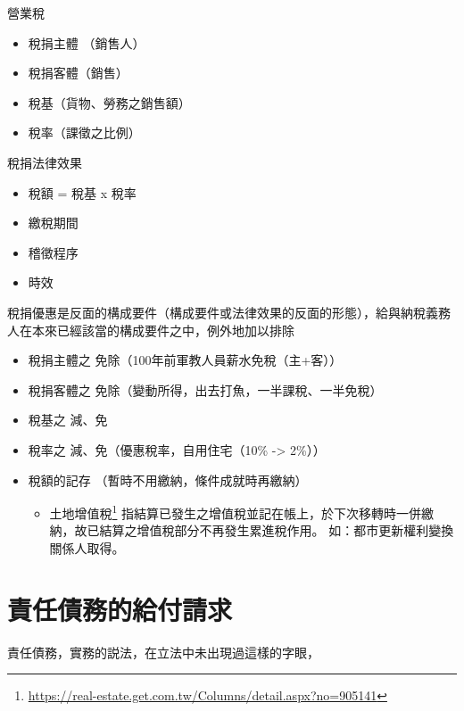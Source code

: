 \documentclass[]{ctexbook}
\providecommand{\tightlist}{%
  \setlength{\itemsep}{0pt}\setlength{\parskip}{0pt}}
\renewcommand{\href}[2]{#2\footnote{\url{#1}}}
\begin{document}
營業稅

\begin{itemize}
\tightlist
\item
  稅捐主體 （銷售人）
\item
  稅捐客體（銷售）
\item
  稅基（貨物、勞務之銷售額）
\item
  稅率（課徵之比例）
\end{itemize}

稅捐法律效果

\begin{itemize}
\tightlist
\item
  稅額 = 稅基 x 稅率
\item
  繳稅期間
\item
  稽徵程序
\item
  時效
\end{itemize}

稅捐優惠是反面的構成要件（構成要件或法律效果的反面的形態），給與納稅義務人在本來已經該當的構成要件之中，例外地加以排除

\begin{itemize}
\tightlist
\item
  稅捐主體之 免除（100年前軍教人員薪水免稅（主+客））
\item
  稅捐客體之 免除（變動所得，出去打魚，一半課稅、一半免稅）
\item
  稅基之 減、免
\item
  稅率之 減、免（優惠稅率，自用住宅（10\% -\textgreater{} 2\%））
\item
  稅額的記存 （暫時不用繳納，條件成就時再繳納）

  \begin{itemize}
  \tightlist
  \item
    \href{https://real-estate.get.com.tw/Columns/detail.aspx?no=905141}{土地增值稅} 指結算已發生之增值稅並記在帳上，於下次移轉時一併繳納，故已結算之增值稅部分不再發生累進稅作用。 如：都市更新權利變換關係人取得。
  \end{itemize}
\end{itemize}

\hypertarget{ux8cacux4efbux50b5ux52d9ux7684ux7d66ux4ed8ux8acbux6c42}{%
\section{責任債務的給付請求}\label{ux8cacux4efbux50b5ux52d9ux7684ux7d66ux4ed8ux8acbux6c42}}

責任債務，實務的説法，在立法中未出現過這樣的字眼，
\end{document}
